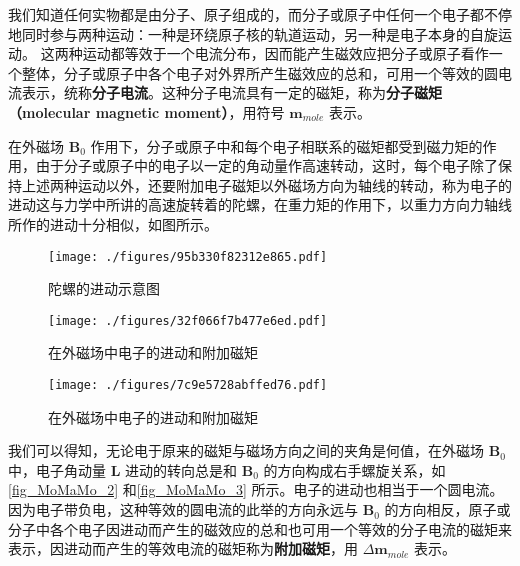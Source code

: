 
我们知道任何实物都是由分子、原子组成的，而分子或原子中任何一个电子都不停地同时参与两种运动：一种是环绕原子核的轨道运动，另一种是电子本身的自旋运动。 这两种运动都等效于一个电流分布，因而能产生磁效应把分子或原子看作一个整体，分子或原子中各个电子对外界所产生磁效应的总和，可用一个等效的圆电流表示，统称\textbf{分子电流}。这种分子电流具有一定的磁矩，称为\textbf{分子磁矩（molecular magnetic moment）}，用符号 $\mathbf m_{mole}$ 表示。

在外磁场 $\mathbf B_0$ 作用下，分子或原子中和每个电子相联系的磁矩都受到磁力矩的作用，由于分子或原子中的电子以一定的角动量作高速转动，这时，每个电子除了保持上述两种运动以外，还要附加电子磁矩以外磁场方向为轴线的转动，称为电子的进动这与力学中所讲的高速旋转着的陀螺，在重力矩的作用下，以重力方向力轴线所作的进动十分相似，如图所示。
\begin{figure}[ht]
\centering
\texttt{[image: ./figures/95b330f82312e865.pdf]}
\caption{陀螺的进动示意图} \label{fig_MoMaMo_1}
\end{figure}
\begin{figure}[ht]
\centering
\texttt{[image: ./figures/32f066f7b477e6ed.pdf]}
\caption{在外磁场中电子的进动和附加磁矩} \label{fig_MoMaMo_2}
\end{figure}
\begin{figure}[ht]
\centering
\texttt{[image: ./figures/7c9e5728abffed76.pdf]}
\caption{在外磁场中电子的进动和附加磁矩} \label{fig_MoMaMo_3}
\end{figure}

我们可以得知，无论电于原来的磁矩与磁场方向之间的夹角是何值，在外磁场 $\mathbf B_0$ 中，电子角动量 $\mathbf L$ 进动的转向总是和 $\mathbf B_0$ 的方向构成右手螺旋关系，如\autoref{fig_MoMaMo_2} 和\autoref{fig_MoMaMo_3} 所示。电子的进动也相当于一个圆电流。因为电子带负电，这种等效的圆电流的此举的方向永远与 $\mathbf B_0$ 的方向相反，原子或分子中各个电子因进动而产生的磁效应的总和也可用一个等效的分子电流的磁矩来表示，因进动而产生的等效电流的磁矩称为\textbf{附加磁矩}，用 $\Delta\mathbf m_{mole}$ 表示。
